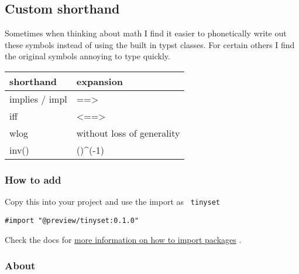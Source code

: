 \subsection{Custom shorthand}\label{custom-shorthand}

Sometimes when thinking about math I find it easier to phonetically
write out these symbols instead of using the built in typst classes. For
certain others I find the original symbols annoying to type quickly.

\begin{longtable}[]{@{}ll@{}}
\toprule\noalign{}
shorthand & expansion \\
\midrule\noalign{}
\endhead
\bottomrule\noalign{}
\endlastfoot
implies / impl & ==\textgreater{} \\
iff & \textless==\textgreater{} \\
wlog & without loss of generality \\
inv() & ()\^{}(-1) \\
\end{longtable}

\subsubsection{How to add}\label{how-to-add}

Copy this into your project and use the import as \texttt{\ tinyset\ }

\begin{verbatim}
#import "@preview/tinyset:0.1.0"
\end{verbatim}



Check the docs for
\href{https://typst.app/docs/reference/scripting/\#packages}{more
information on how to import packages} .

\subsubsection{About}\label{about}

